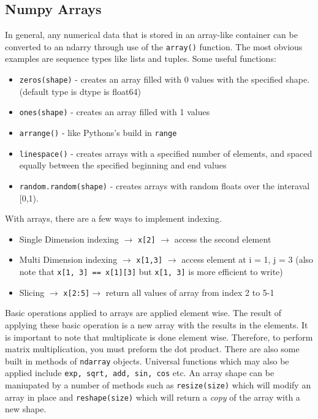 \documentclass[english, 10pt]{article}
\begin{document}
\subsection{Numpy Arrays}
In general, any numerical data that is stored in an array-like container can be converted to an ndarry through use of the \texttt{array()} function. The most obvious examples are sequence types like lists and tuples. Some useful functions:
\begin{itemize}
	\item \texttt{zeros(shape)} - creates an array filled with 0 values with the specified shape. (default type is dtype is float64)
	\item \texttt{ones(shape)} - creates an array filled with 1 values
	\item \texttt{arrange()} - like Pythons's build in \texttt{range}
	\item \texttt{linespace()} - creates arrays with a specified number of elements, and spaced equally between the specified beginning and end values
	\item \texttt{random.random(shape)} - creates arrays with random floats over the interaval [0,1).
\end{itemize}
With arrays, there are a few ways to implement indexing.
\begin{itemize}
	\item Single Dimension indexing $\rightarrow$ \texttt{x[2]} $\rightarrow$ access the second element
	\item Multi Dimension indexing $\rightarrow$ \texttt{x[1,3]} $\rightarrow$ access element at i = 1, j = 3 (also note that \texttt{x[1, 3] == x[1][3]} but \texttt{x[1, 3]} is more efficient to write)
	\item Slicing $\rightarrow$ \texttt{x[2:5]}$\rightarrow$ return all values of array from index 2 to 5-1 
\end{itemize}
\begin{tcolorbox}[title=Aside: Array Operations,colframe=black,colback=white,arc=0pt,fonttitle=\bfseries]
	Basic operations applied to arrays are applied element wise. The result of applying these basic operation is a new array with the results in the elements. \newline\newline
	It is important to note that multiplicate is done element wise. Therefore, to perform matrix multiplication, you must preform the dot product. \newline\newline
	There are also some built in methods of \texttt{ndarray} objects. Universal functions which may also be applied include \texttt{exp, sqrt, add, sin, cos} etc. \newline\newline
	An array shape can be maniupated by a number of methods such as \texttt{resize(size)} which will modify an array in place and \texttt{reshape(size)} which will return a \textit{copy} of the array with a new shape.
	\end{tcolorbox}
\end{document}
